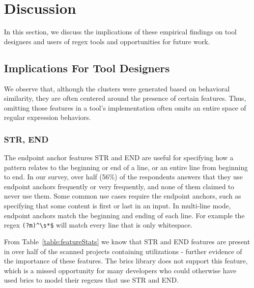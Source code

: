 \section{Discussion}
\label{sec:discussion}

In this section, we discuss the implications of these empirical findings on tool designers and users of regex tools and opportunities for future work.


\subsection{Implications For Tool Designers}

We observe that, although the clusters were generated based on behavioral similarity, they are often centered around the presence of certain features. Thus, omitting those features in a tool's implementation often omits an entire space of regular expression behaviors.


\subsubsection{STR, END}
The endpoint anchor features STR and END are useful for specifying how a pattern relates to the beginning or end of a line, or an entire line from beginning to end.  In our survey, over half (56\%) of the respondents answers that they use endpoint anchors frequently or very frequently, and none of them claimed to never use them.  Some common use cases require the endpoint anchors, such as specifying that some content is first or last in an input.  In multi-line mode, endpoint anchors match the beginning and ending of each line.  For example the regex \verb!(?m)^\s*$! will match every line that is only whitespace.

From Table~\ref{table:featureStats} we know that STR and END features are present in over half of the scanned projects containing utilizations - further evidence of the importance of these features.  The brics library does not support this feature, which is a missed opportunity for many developers who could otherwise have used brics to model their regexes that use STR and END.


